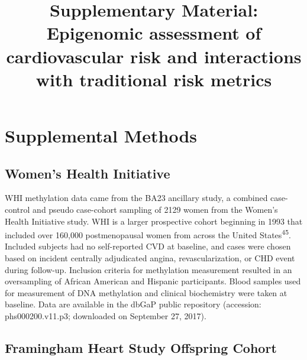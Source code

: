 \documentclass[]{article}
\title{Supplementary Material: Epigenomic assessment of cardiovascular risk and
interactions with traditional risk metrics}
\author{}
\date{}
\begin{document}
\maketitle

\newcommand{\beginsupplement}{
  \setcounter{table}{0}  
  \renewcommand{\thetable}{S\arabic{table}}
  \setcounter{figure}{0} 
  \renewcommand{\thefigure}{S\arabic{figure}}
}

\setcounter{table}{0}  
  \renewcommand{\thetable}{S\arabic{table}}
  \setcounter{figure}{0} 
  \renewcommand{\thefigure}{S\arabic{figure}}

\hypertarget{supplemental-methods}{%
\section{Supplemental Methods}\label{supplemental-methods}}

\hypertarget{womens-health-initiative}{%
\subsection{Women's Health Initiative}\label{womens-health-initiative}}

WHI methylation data came from the BA23 ancillary study, a combined
case-control and pseudo case-cohort sampling of 2129 women from the
Women's Health Initiative study. WHI is a larger prospective cohort
beginning in 1993 that included over 160,000 postmenopausal women from
across the United States\textsuperscript{45}. Included subjects had no
self-reported CVD at baseline, and cases were chosen based on incident
centrally adjudicated angina, revascularization, or CHD event during
follow-up. Inclusion criteria for methylation measurement resulted in an
oversampling of African American and Hispanic participants. Blood
samples used for measurement of DNA methylation and clinical
biochemistry were taken at baseline. Data are available in the dbGaP
public repository (accession: phs000200.v11.p3; downloaded on September
27, 2017).

\hypertarget{framingham-heart-study-offspring-cohort}{%
\subsection{Framingham Heart Study Offspring
Cohort}\label{framingham-heart-study-offspring-cohort}}
\end{document}
